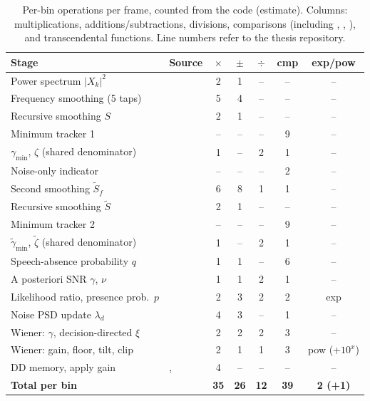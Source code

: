 \begin{table}[htbp]
\centering\footnotesize
\setlength{\tabcolsep}{4pt}
\caption{Per-bin operations per frame, counted from the code (estimate).
Columns: multiplications, additions/subtractions, divisions, comparisons
(including , , ), and transcendental functions.
Line numbers refer to the thesis repository.}
\label{tab:workload:ops}
\begin{tabularx}{\textwidth}{@{}Ll*{5}{c}@{}}
\toprule
Stage & Source & $\times$ & $\pm$ & $\div$ & cmp & exp/pow \\
\midrule
Power spectrum $|X_k|^2$ &  & 2 & 1 & -- & -- & -- \\
Frequency smoothing (5 taps) &  & 5 & 4 & -- & -- & -- \\
Recursive smoothing $S$ &  & 2 & 1 & -- & -- & -- \\
Minimum tracker 1 &  & -- & -- & -- & 9 & -- \\
$\gamma_\text{min}$, $\zeta$ (shared denominator) &  & 1 & -- & 2 & 1 & -- \\
Noise-only indicator &  & -- & -- & -- & 2 & -- \\
Second smoothing $\tilde S_f$ &  & 6 & 8 & 1 & 1 & -- \\
Recursive smoothing $\tilde S$ &  & 2 & 1 & -- & -- & -- \\
Minimum tracker 2 &  & -- & -- & -- & 9 & -- \\
$\tilde\gamma_\text{min}$, $\tilde\zeta$ (shared denominator) &  & 1 & -- & 2 & 1 & -- \\
Speech-absence probability $q$ &  & 1 & 1 & -- & 6 & -- \\
A posteriori SNR $\gamma$, $\nu$ &  & 1 & 1 & 2 & 1 & -- \\
Likelihood ratio, presence prob.\ $p$ &  & 2 & 3 & 2 & 2 & exp \\
Noise PSD update $\lambda_d$ &  & 4 & 3 & -- & 1 & -- \\
Wiener: $\gamma$, decision-directed $\xi$ &  & 2 & 2 & 2 & 3 & -- \\
Wiener: gain, floor, tilt, clip &  & 2 & 1 & 1 & 3 & pow (+$10^x$) \\
DD memory, apply gain & ,  & 4 & -- & -- & -- & -- \\
\midrule
\textbf{Total per bin} & & \textbf{35} & \textbf{26} & \textbf{12} & \textbf{39} & \textbf{2 (+1)} \\
\bottomrule
\end{tabularx}
\end{table}

